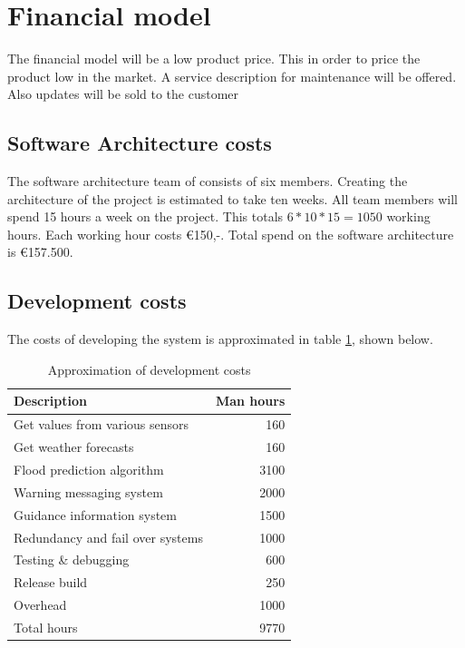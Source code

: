 \section{Financial model}
The financial model will be a low product price. This in order to price the product low in the market. A service description for maintenance will be offered. Also updates will be sold to the customer\\
\subsection{Software Architecture costs}
The software architecture team of \CompanyName consists of six members. Creating the architecture of the project is estimated to take ten weeks. All team members will spend 15 hours a week on the project. This totals $6*10*15=1050$ working hours. Each working hour costs \euro{}150,-. Total spend on the software architecture is \euro{}157.500.
\subsection{Development costs}
The costs of developing the system is approximated in table \ref{table:develop-costs}, shown below.

\begin{table}[H]
	\centering
	\begin{tabular}{lr}
	\toprule
	\textbf{Description} & \multicolumn{1}{l}{\textbf{Man hours}} \\ \hline
	Get values from various sensors & 160 \\ 
	Get weather forecasts & 160 \\ 
	Flood prediction algorithm & 3100 \\ 
	Warning messaging system  & 2000 \\ 
	Guidance information system & 1500 \\ 
	Redundancy and fail over systems & 1000 \\ 
	Testing \& debugging & 600 \\ 
	Release build & 250 \\
	Overhead & 1000 \\ 
	Total hours & 9770 \\
	\bottomrule
	\end{tabular}
	\caption{Approximation of development costs}
	\label{table:develop-costs}
\end{table}

